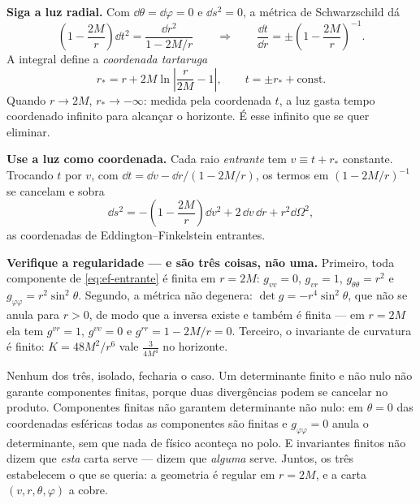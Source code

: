 \documentclass[12pt,a4paper,oneside]{book}
\theoremstyle{rgplain}
\theoremstyle{rgremark}
\begin{document}
\begin{etapas}
  \item \textbf{Siga a luz radial.} Com $\dd\theta=\dd\varphi=0$ e $\dd s^2=0$,
  a métrica de Schwarzschild dá
  \[
    \left(1-\frac{2M}{r}\right)\dd t^2=\frac{\dd r^2}{1-2M/r}
    \qquad\Longrightarrow\qquad
    \frac{\dd t}{\dd r}=\pm\left(1-\frac{2M}{r}\right)^{-1}.
  \]
  A integral define a \emph{coordenada tartaruga}
  \[
    r_*=r+2M\ln\left|\frac{r}{2M}-1\right|,
    \qquad t=\pm r_*+\text{const}.
  \]
  Quando $r\to2M$, $r_*\to-\infty$: medida pela coordenada $t$, a luz gasta
  tempo coordenado infinito para alcançar o horizonte. É esse infinito que se
  quer eliminar.

  \item \textbf{Use a luz como coordenada.} Cada raio \emph{entrante} tem
  $v\equiv t+r_*$ constante. Trocando $t$ por $v$, com
  $\dd t=\dd v-\dd r/(1-2M/r)$, os termos em $(1-2M/r)^{-1}$ se cancelam e
  sobra
  \begin{equation}
    \dd s^2=-\left(1-\frac{2M}{r}\right)\dd v^2+2\,\dd v\,\dd r+r^2\dd\Omega^2 ,
    \label{eq:ef-entrante}
  \end{equation}
  as coordenadas de Eddington--Finkelstein entrantes.

  \item \textbf{Verifique a regularidade --- e são três coisas, não uma.}
  Primeiro, toda componente de \eqref{eq:ef-entrante} é finita em $r=2M$:
  $g_{vv}=0$, $g_{vr}=1$, $g_{\theta\theta}=r^2$ e
  $g_{\varphi\varphi}=r^2\sin^2\theta$. Segundo, a métrica não degenera:
  $\det g=-r^4\sin^2\theta$, que não se anula para $r>0$, de modo que a inversa
  existe e também é finita --- em $r=2M$ ela tem $g^{vr}=1$, $g^{vv}=0$ e
  $g^{rr}=1-2M/r=0$. Terceiro, o invariante de curvatura é finito:
  $K=48M^2/r^6$ vale $\frac{3}{4M^4}$ no horizonte.

  Nenhum dos três, isolado, fecharia o caso. Um determinante finito e não nulo
  não garante componentes finitas, porque duas divergências podem se cancelar no
  produto. Componentes finitas não garantem determinante não nulo: em
  $\theta=0$ das coordenadas esféricas todas as componentes são finitas e
  $g_{\varphi\varphi}=0$ anula o determinante, sem que nada de físico aconteça
  no polo. E invariantes finitos não dizem que \emph{esta} carta serve --- dizem
  que \emph{alguma} serve. Juntos, os três estabelecem o que se queria: a
  geometria é regular em $r=2M$, e a carta $(v,r,\theta,\varphi)$ a cobre.


\end{etapas}
\end{document}
